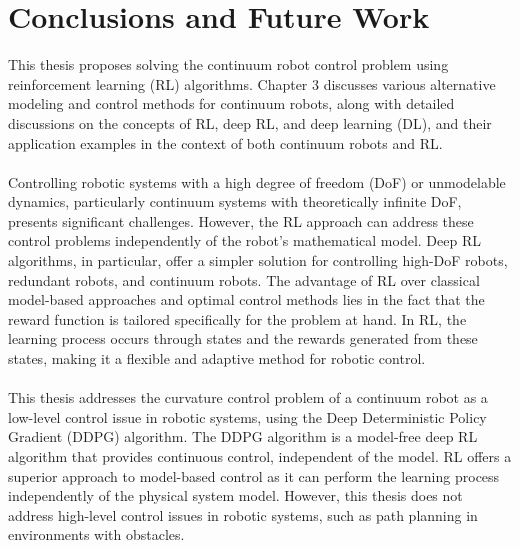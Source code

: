 \documentclass[12pt,twoside,a4]{mwbk}
\begin{document}

\chapter{Conclusions and Future Work}
This thesis proposes solving the continuum robot control problem using reinforcement learning (RL) algorithms. Chapter 3 discusses various alternative modeling and control methods for continuum robots, along with detailed discussions on the concepts of RL, deep RL, and deep learning (DL), and their application examples in the context of both continuum robots and RL.
\\ \\
Controlling robotic systems with a high degree of freedom (DoF) or unmodelable dynamics, particularly continuum systems with theoretically infinite DoF, presents significant challenges. However, the RL approach can address these control problems independently of the robot's mathematical model. Deep RL algorithms, in particular, offer a simpler solution for controlling high-DoF robots, redundant robots, and continuum robots. The advantage of RL over classical model-based approaches and optimal control methods lies in the fact that the reward function is tailored specifically for the problem at hand. In RL, the learning process occurs through states and the rewards generated from these states, making it a flexible and adaptive method for robotic control.
\\ \\
This thesis addresses the curvature control problem of a continuum robot as a low-level control issue in robotic systems, using the Deep Deterministic Policy Gradient (DDPG) algorithm. The DDPG algorithm is a model-free deep RL algorithm that provides continuous control, independent of the model. RL offers a superior approach to model-based control as it can perform the learning process independently of the physical system model. However, this thesis does not address high-level control issues in robotic systems, such as path planning in environments with obstacles.
\\ \\
\end{document}
